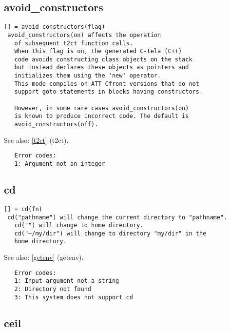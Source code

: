 \documentclass[a4paper]{article}
\begin{document}
\subsection{avoid\_constructors\label{avoid_constructors}}

\begin{tscreen}
\begin{verbatim}
[] = avoid_constructors(flag)
 avoid_constructors(on) affects the operation
   of subsequent t2ct function calls.
   When this flag is on, the generated C-tela (C++)
   code avoids constructing class objects on the stack
   but instead declares these objects as pointers and
   initializes them using the 'new' operator.
   This mode compiles on ATT Cfront versions that do not
   support goto statements in blocks having constructors.

   However, in some rare cases avoid_constructors(on)
   is known to produce incorrect code. The default is
   avoid_constructors(off).
\end{verbatim}

See also: \ref{t2ct} {(t2ct)}.
\begin{verbatim}
   Error codes:
   1: Argument not an integer
\end{verbatim}
\end{tscreen}



\subsection{cd\label{cd}}

\begin{tscreen}
\begin{verbatim}
[] = cd(fn)
 cd("pathname") will change the current directory to "pathname".
   cd("") will change to home directory.
   cd("~/my/dir") will change to directory "my/dir" in the
   home directory.
\end{verbatim}

See also: \ref{getenv} {(getenv)}.
\begin{verbatim}
   Error codes:
   1: Input argument not a string
   2: Directory not found
   3: This system does not support cd 
\end{verbatim}
\end{tscreen}



\subsection{ceil\label{ceil}}
\end{document}
